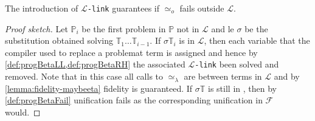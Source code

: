 \documentclass[sigconf,natbib=false,review]{acmart}
\newcommand{\UnifRel}{\ensuremath{\simeq}}
\newcommand{\Uo}{\texorpdfstring{\ensuremath{\UnifRel_o}\xspace}{unif\_o}}
\newcommand{\Ue}{\ensuremath{\UnifRel_\lambda}\xspace}
\newcommand{\llambda}{\ensuremath{\mathcal{L}}\xspace}
\newcommand{\linkMacro}[1]{\ensuremath{#1}\texttt{-link}\xspace}
\newcommand{\linkbeta}{\linkMacro{\llambda}}
\newcommand{\linketa} {\linkMacro{\eta}}
\newcommand{\Fo}{\texorpdfstring{\ensuremath{\mathcal{F}\xspace}}{F}} %
\newcommand{\rhs}{rhs\xspace}
\newcommand{\linkStore}{\texorpdfstring{\ensuremath{\mathbb{L}}\xspace}{L}}
\newcommand{\foUnifPb}{\ensuremath{\mathbb{P}}\xspace}
\newcommand{\hoUnifPb}{\ensuremath{\mathbb{T}}\xspace}
\begin{document}

\begin{theorem}[Fidelity in \Fo]
  The introduction of \linkbeta guarantees 
  if \Uo{} fails outside \llambda.
\end{theorem}

\begin{proof}[Proof sketch]
  Let $\foUnifPb_i$ be the first problem in \foUnifPb not in \llambda and
  le $\sigma$ be the substitution obtained solving $\hoUnifPb_1\ldots\hoUnifPb_{i-1}$.
  If $\sigma\hoUnifPb_i$ is in \llambda, then each variable that the
  compiler used to replace a problemat term is assigned and hence
  by \cref{def:progBetaLL,def:progBetaRH} the associated \linkbeta
  been solved and removed. Note that in this case all
  calls to \Ue{} are between terms in \llambda and by \cref{lemma:fidelity-maybeeta}
  fidelity is guaranteed. If $\sigma\hoUnifPb$ is still in \notllambda,
  then by \cref{def:progBetaFail} unification fails as the
  corresponding unification in \Fo{} would.
\end{proof}
\end{document}
